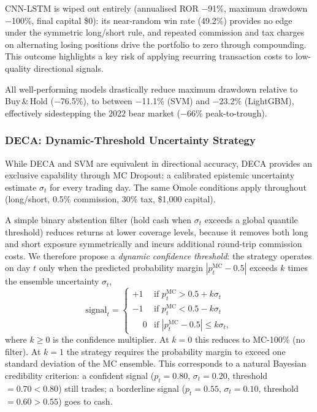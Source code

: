 \documentclass[final,3p,times,authoryear]{elsarticle}
\begin{document}
CNN-LSTM is wiped out entirely (annualised ROR $-$91\%, maximum
drawdown $-$100\%, final capital \$0): its near-random win rate (49.2\%)
provides no edge under the symmetric long/short rule, and repeated
commission and tax charges on alternating losing positions drive the
portfolio to zero through compounding.
This outcome highlights a key risk of applying recurring transaction
costs to low-quality directional signals.

All well-performing models drastically reduce maximum drawdown relative
to Buy\,\&\,Hold ($-$76.5\%), to between $-$11.1\% (SVM) and $-$23.2\%
(LightGBM), effectively sidestepping the 2022 bear market
($-$66\% peak-to-trough).

\subsubsection{DECA: Dynamic-Threshold Uncertainty Strategy}
\label{sec:mc_backtesting}

While DECA and SVM are equivalent in directional accuracy, DECA
provides an exclusive capability through MC Dropout: a calibrated
epistemic uncertainty estimate $\sigma_t$ for every trading day.
The same Omole conditions apply throughout (long/short, 0.5\%
commission, 30\% tax, \$1{,}000 capital).

A simple binary abstention filter (hold cash when $\sigma_t$ exceeds
a global quantile threshold) reduces returns at lower coverage levels,
because it removes both long and short exposure symmetrically and
incurs additional round-trip commission costs.
We therefore propose a \emph{dynamic confidence threshold}: the
strategy operates on day $t$ only when the predicted probability
margin $|p_t^{\mathrm{MC}} - 0.5|$ exceeds $k$ times the ensemble
uncertainty $\sigma_t$,
\begin{equation}
\mathrm{signal}_t = \begin{cases}
+1 & \text{if } p_t^{\mathrm{MC}} > 0.5 + k\sigma_t \\
-1 & \text{if } p_t^{\mathrm{MC}} < 0.5 - k\sigma_t \\
\phantom{+}0 & \text{if } |p_t^{\mathrm{MC}} - 0.5| \leq k\sigma_t,
\end{cases}
\label{eq:dynthresh}
\end{equation}
where $k \geq 0$ is the confidence multiplier.
At $k=0$ this reduces to MC-100\% (no filter).
At $k=1$ the strategy requires the probability margin to exceed one
standard deviation of the MC ensemble. This corresponds to a natural
Bayesian credibility criterion: a confident signal ($p_t=0.80$,
$\sigma_t=0.20$, threshold $=0.70 <0.80$) still trades; a borderline
signal ($p_t=0.55$, $\sigma_t=0.10$, threshold $=0.60>0.55$) goes to cash.
\end{document}

